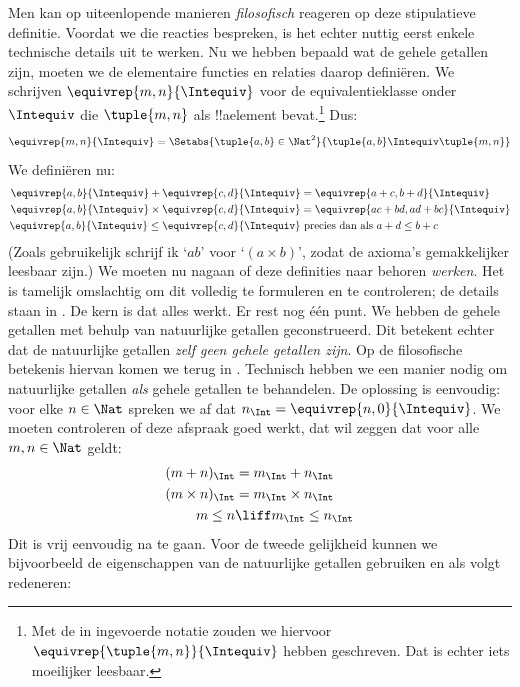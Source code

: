 \documentclass[openany]{memoir}
\begin{document}
Men kan op uiteenlopende manieren \emph{filosofisch} reageren op deze
stipulatieve definitie. Voordat we die reacties bespreken, is het echter
nuttig eerst enkele technische details uit te werken.
Nu we hebben bepaald wat de gehele getallen zijn, moeten we de elementaire
functies en relaties daarop definiëren. We schrijven
$\equivrep{m, n}{\Intequiv}$ voor de equivalentieklasse onder
$\Intequiv$ die $\tuple{m, n}$ als !!a{element} bevat.\footnote{Met de
in  ingevoerde notatie
zouden we hiervoor $\equivrep{\tuple{m,n}}{\Intequiv}$ hebben
geschreven. Dat is echter iets moeilijker leesbaar.} Dus:
	$$\equivrep{m, n}{\Intequiv} = \Setabs{\tuple{a, b} \in \Nat^2}{\tuple{a, b}\Intequiv \tuple{m, n}}$$
We definiëren nu:
	\begin{align*}
		\equivrep{a, b}{\Intequiv} + \equivrep{c, d}{\Intequiv} &= \equivrep{a + c, b + d}{\Intequiv}\\
		\equivrep{a, b}{\Intequiv} \times \equivrep{c, d}{\Intequiv} &= \equivrep{a c + b  d, a  d + b c}{\Intequiv}\\
		\equivrep{a, b}{\Intequiv} \leq \equivrep{c, d}{\Intequiv} &\text{ precies dan als }a + d \leq b + c
	\end{align*}	
(Zoals gebruikelijk schrijf ik `$ab$' voor `$(a \times b)$', zodat de
axioma's gemakkelijker leesbaar zijn.) We moeten nu nagaan of deze
definities naar behoren \emph{werken}. Het
is tamelijk omslachtig om dit volledig te formuleren en te controleren;
de details staan in . De kern is dat alles werkt.
Er rest nog één punt. We hebben de gehele getallen met behulp van
natuurlijke getallen geconstrueerd. Dit betekent echter dat de
natuurlijke getallen \emph{zelf geen gehele getallen zijn}. Op de
filosofische betekenis hiervan komen we terug in .
Technisch hebben we een manier nodig om natuurlijke getallen
\emph{als} gehele getallen te behandelen. De oplossing is eenvoudig:
voor elke $n \in \Nat$ spreken we af dat $n_\Int =
\equivrep{n, 0}{\Intequiv}$. We
moeten controleren of deze afspraak goed werkt, dat wil
zeggen dat voor alle $m, n \in \Nat$ geldt:
\begin{align*}
	(m + n)_\Int &= m_\Int + n_\Int\\
	(m \times n)_\Int &= m_\Int \times n_\Int\\
	m \leq n &\liff m_\Int \leq n_\Int
\end{align*}
Dit is vrij eenvoudig na te gaan. Voor de tweede gelijkheid
kunnen we bijvoorbeeld de eigenschappen van de natuurlijke getallen
gebruiken en als volgt redeneren:
\end{document}
